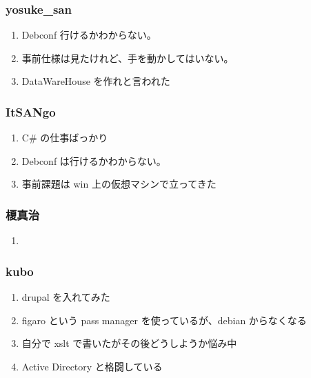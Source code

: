 \documentclass[cjk,dvipdfmx,10pt,compress,%
hyperref={bookmarks=true,bookmarksnumbered=true,bookmarksopen=false,%
colorlinks=false,%
pdftitle={第 132 回 関西 Debian 勉強会},%
pdfauthor={かわだ},%
pdfsubject={資料},%
}]{beamer}
\begin{document}
\begin{frame}
  \frametitle{yosuke\_san}
  \begin{enumerate}
		\item Debconf 行けるかわからない。
		\item 事前仕様は見たけれど、手を動かしてはいない。
		\item DataWareHouse を作れと言われた
  \end{enumerate}
\end{frame}
 
\begin{frame}
  \frametitle{ItSANgo}
  \begin{enumerate}
		 \item C\# の仕事ばっかり
		 \item Debconf は行けるかわからない。
		 \item 事前課題は win 上の仮想マシンで立ってきた
  \end{enumerate}
\end{frame}

\begin{frame}
  \frametitle{榎真治}
  \begin{enumerate}
		  \item
  \end{enumerate}
\end{frame}

\begin{frame}
  \frametitle{kubo}
  \begin{enumerate}
	  \item drupal を入れてみた
	  \item figaro という pass manager を使っているが、debian からなくなる
      \item 自分で xslt で書いたがその後どうしようか悩み中
	  \item Active Directory と格闘している
  \end{enumerate}
\end{frame}



\end{document}
